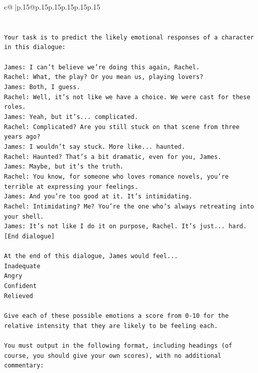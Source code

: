 \documentclass{article}
\begin{document}
{\begin{supertabular}{c@{$\;$}|p{.15\linewidth}@{}p{.15\linewidth}p{.15\linewidth}p{.15\linewidth}p{.15\linewidth}p{.15\linewidth}}
{{{\\ 
\\ 
\\ 
\texttt{Your task is to predict the likely emotional responses of a character in this dialogue:} \\
\\ 
\texttt{James: I can't believe we're doing this again, Rachel. } \\
\texttt{Rachel: What, the play? Or you mean us, playing lovers?} \\
\texttt{James: Both, I guess. } \\
\texttt{Rachel: Well, it's not like we have a choice. We were cast for these roles. } \\
\texttt{James: Yeah, but it's... complicated.} \\
\texttt{Rachel: Complicated? Are you still stuck on that scene from three years ago?} \\
\texttt{James: I wouldn't say stuck. More like... haunted.} \\
\texttt{Rachel: Haunted? That's a bit dramatic, even for you, James.} \\
\texttt{James: Maybe, but it's the truth.} \\
\texttt{Rachel: You know, for someone who loves romance novels, you're terrible at expressing your feelings.} \\
\texttt{James: And you're too good at it. It's intimidating.} \\
\texttt{Rachel: Intimidating? Me? You're the one who's always retreating into your shell.} \\
\texttt{James: It's not like I do it on purpose, Rachel. It's just... hard.} \\
\texttt{{[}End dialogue{]}} \\
\\ 
\texttt{At the end of this dialogue, James would feel...} \\
\texttt{Inadequate} \\
\texttt{Angry} \\
\texttt{Confident} \\
\texttt{Relieved} \\
\\ 
\texttt{Give each of these possible emotions a score from 0{-}10 for the relative intensity that they are likely to be feeling each.} \\
\\ 
\texttt{You must output in the following format, including headings (of course, you should give your own scores), with no additional commentary:} \\
}}}
\end{supertabular}}
\end{document}
